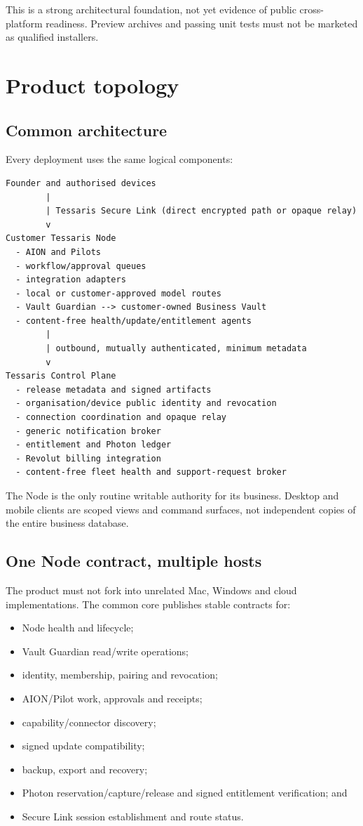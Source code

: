 \documentclass[11pt]{article}
\begin{document}
This is a strong architectural foundation, not yet evidence of public cross-platform readiness. Preview archives and passing unit tests must not be marketed as qualified installers.

\section{Product topology}

\subsection{Common architecture}

Every deployment uses the same logical components:

\begin{verbatim}
Founder and authorised devices
        |
        | Tessaris Secure Link (direct encrypted path or opaque relay)
        v
Customer Tessaris Node
  - AION and Pilots
  - workflow/approval queues
  - integration adapters
  - local or customer-approved model routes
  - Vault Guardian --> customer-owned Business Vault
  - content-free health/update/entitlement agents
        |
        | outbound, mutually authenticated, minimum metadata
        v
Tessaris Control Plane
  - release metadata and signed artifacts
  - organisation/device public identity and revocation
  - connection coordination and opaque relay
  - generic notification broker
  - entitlement and Photon ledger
  - Revolut billing integration
  - content-free fleet health and support-request broker
\end{verbatim}

The Node is the only routine writable authority for its business. Desktop and mobile clients are scoped views and command surfaces, not independent copies of the entire business database.

\subsection{One Node contract, multiple hosts}

The product must not fork into unrelated Mac, Windows and cloud implementations. The common core publishes stable contracts for:

\begin{itemize}
  \item Node health and lifecycle;
  \item Vault Guardian read/write operations;
  \item identity, membership, pairing and revocation;
  \item AION/Pilot work, approvals and receipts;
  \item capability/connector discovery;
  \item signed update compatibility;
  \item backup, export and recovery;
  \item Photon reservation/capture/release and signed entitlement verification; and
  \item Secure Link session establishment and route status.
\end{itemize}
\end{document}
